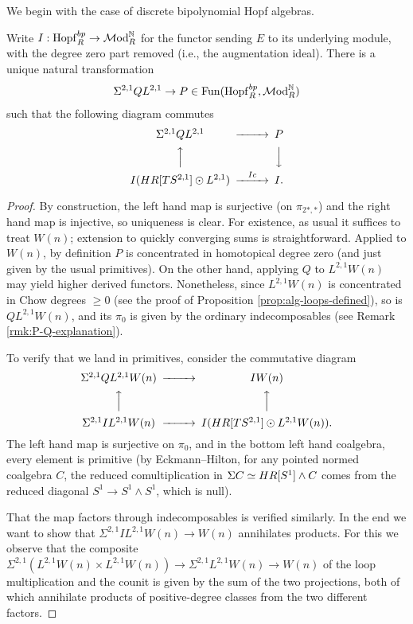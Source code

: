 \documentclass{amsart}
\renewcommand{\NB}[1]{}
\numberwithin{proposition}{section}
\numberwithin{equation}{section}
\def\Hopf{\mathrm{Hopf}}
\def\Hopf{\mathrm{Hopf}}
\def\hotimes{\odot}
\def\hLoops{L}
\begin{document}
We begin with the case of discrete bipolynomial Hopf algebras.
\begin{lemma}\label{lemm:hopfbp-nat-trans}
Write $I: \Hopf_R^{bp} \to \Mod_R^\N$ for the functor sending $E$ to its underlying module, with the degree zero part removed (i.e., the augmentation ideal).
There is a unique natural transformation \[ \Sigma^{2,1}Q\hLoops^{2,1} \to P \in \Fun(\Hopf_R^{bp}, \Mod_R^\N) \] such that the following diagram commutes
\begin{equation*}
\begin{CD}
\Sigma^{2,1}Q\hLoops^{2,1} @>>> P \\
@AAA                       @VVV \\
I(HR[TS^{2,1}] \hotimes\hLoops^{2,1}) @>Ic>> I.
\end{CD}
\end{equation*}
\end{lemma}
\begin{proof}
By construction, the left hand map is surjective (on $\pi_{2*,*}$) and the right hand map is injective, so uniqueness is clear.
For existence, as usual it suffices to treat $W(n)$; extension to quickly converging sums is straightforward.
Applied to $W(n)$, by definition $P$ is concentrated in homotopical degree zero (and just given by the usual primitives).
On the other hand, applying $Q$ to $\hLoops^{2,1}W(n)$ may yield higher derived functors.
Nonetheless, since $\hLoops^{2,1}W(n)$ is concentrated in Chow degrees $\ge 0$ (see the proof of Proposition \ref{prop:alg-loops-defined}), so is $Q\hLoops^{2,1}W(n)$, and its $\pi_0$ is given by the ordinary indecomposables (see Remark \ref{rmk:P-Q-explanation}).

To verify that we land in primitives, consider the commutative diagram
\begin{equation*}
\begin{CD}
\Sigma^{2,1}Q\hLoops^{2,1}W(n) @>>> IW(n) \\
@AAA                                    @AAA \\
\Sigma^{2,1}I\hLoops^{2,1}W(n) @>>> I(HR[TS^{2,1}] \hotimes\hLoops^{2,1}W(n)).
\end{CD}
\end{equation*}
The left hand map is surjective on $\pi_0$, and in the bottom left hand coalgebra, every element is primitive (by Eckmann--Hilton, for any pointed normed coalgebra $C$, the reduced comultiplication in $\Sigma C \simeq HR[S^1] \wedge C$ comes from the reduced diagonal $S^1 \to S^1 \wedge S^1$, which is null\NB{details?}).

That the map factors through indecomposables is verified similarly.
In the end we want to show that $\Sigma^{2,1}I\hLoops^{2,1}W(n) \to W(n)$ annihilates products.
For this we observe that the composite $\Sigma^{2,1}(\hLoops^{2,1}W(n) \times \hLoops^{2,1}W(n)) \to \Sigma^{2,1} \hLoops^{2,1}W(n) \to W(n)$ of the loop multiplication and the counit is given by the sum of the two projections, both of which annihilate products of positive-degree classes from the two different factors.
\end{proof}
\end{document}
